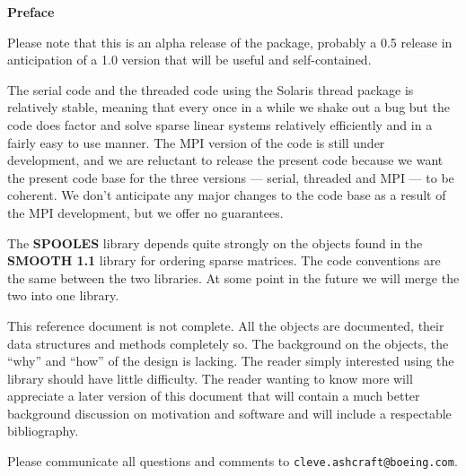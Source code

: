 \newpage
\centerline{\Large\bf Preface}
\par
\medskip
\par
Please note that this is an alpha release of the package,
probably a 0.5 release in anticipation of a 1.0 version that
will be useful and self-contained.
\par
The serial code and the threaded code using the Solaris thread package
is relatively stable, meaning that every once in a while we shake
out a bug but the code does factor and solve sparse linear systems
relatively efficiently and in a fairly easy to use manner.
The MPI version of the code is still under development, and we are
reluctant to release the present code because we want the present code 
base for the three versions --- serial, threaded and MPI --- to be
coherent. We don't anticipate any major changes to the code base as
a result of the MPI development, but we offer no guarantees.
\par
The {\bf SPOOLES} library depends quite strongly on the objects
found in the {\bf SMOOTH 1.1} library for ordering sparse matrices.
The code conventions are the same between the two libraries.
At some point in the future we will merge the two into one library.
\par
This reference document is not complete.
All the objects are documented, their data structures and
methods completely so.
The background on the objects, the ``why'' and ``how'' of the
design is lacking.
The reader simply interested using the library should have little
difficulty.
The reader wanting to know more will appreciate a later version of
this document that will contain a much better background discussion 
on motivation and software and will include a respectable
bibliography.
\par
Please communicate all questions and comments to
{\tt cleve.ashcraft@boeing.com}.
